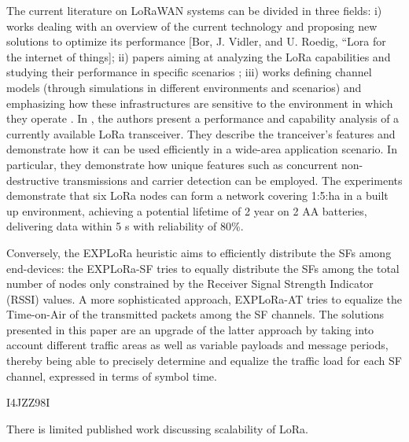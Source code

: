 The current literature on LoRaWAN systems can be divided in three fields:
	i) works dealing with an overview of the current technology and proposing new solutions to optimize its performance [Bor,
	J.
Vidler,
	and U.
Roedig,
	“Lora for the internet of things]\cite{augustin_study_2016};
	ii) papers aiming at analyzing the LoRa capabilities and studying their performance in specific scenarios \cite{voigt_mitigating_2016}\cite{georgiou_low_2017}\cite{mikhaylov_analysis_2016}\cite{reynders_power_2017};
	iii) works defining channel models (through simulations in different environments and scenarios) and emphasizing how these infrastructures are sensitive to the environment in which they operate \cite{petajajarvi_coverage_2015}.
In \cite{bor_lora_nodate},
	the authors present a performance and capability analysis of a currently available LoRa transceiver.
They describe the tranceiver’s features and demonstrate how it can be used efficiently in a wide-area application scenario.
In particular,
	they demonstrate how unique features such as concurrent non-destructive transmissions and carrier detection can be employed.
The experiments demonstrate that six LoRa nodes can form a network covering 1:5:ha in a built up environment,
	achieving a potential lifetime of 2 year on 2 AA batteries,
	delivering data within 5 s with reliability of 80\%.


Conversely,
	the EXPLoRa heuristic \cite{cuomo_explora_2017} aims to efficiently distribute the SFs among end-devices:
	the EXPLoRa-SF tries to equally distribute the SFs among the total number of nodes only constrained by the Receiver Signal Strength Indicator (RSSI) values.
A more sophisticated approach,
	EXPLoRa-AT tries to equalize the Time-on-Air of the transmitted packets among the SF channels.
The solutions presented in this paper are an upgrade of the latter approach by taking into account different traffic areas as well as variable payloads and message periods,
	thereby being able to precisely determine and equalize the traffic load for each SF channel,
	expressed in terms of symbol time.
	

\cite{bor_lora_2016} I4JZZ98I

There is limited published work discussing scalability of LoRa.

